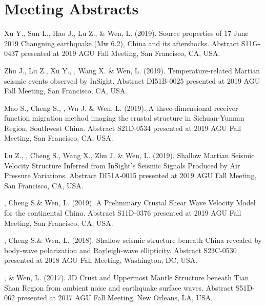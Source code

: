 \section*{Meeting Abstracts}
\begin{etaremune}
\item
    Xu Y., Sun L., Hao J., Lu Z., \Xiao \& Wen, L. (2019).
    Source properties of 17 June 2019 Changning earthquake (Mw 6.2), China and its aftershocks.
    Abstract S11G-0437 presented at 2019 AGU Fall Meeting, San Francisco, CA, USA.
\item
    Zhu J., Lu Z., Xu Y., \Xiao, Wang X. \& Wen, L. (2019).
    Temperature-related Martian seismic events observed by InSight.
    Abstract DI51B-0025 presented at 2019 AGU Fall Meeting, San Francisco, CA, USA.
\item
    Mao S., Cheng S., \Xiao, Wu J. \& Wen, L. (2019).
    A three-dimensional receiver function migration method imaging the crustal structure in Sichuan-Yunnan Region, Southwest China. 
    Abstract S21D-0534 presented at 2019 AGU Fall Meeting, San Francisco, CA, USA.
\item
    Lu Z., \Xiao, Cheng S., Wang X., Zhu J. \& Wen, L. (2019).
    Shallow Martian Seismic Velocity Structure Inferred from InSight's Seismic Signals Produced by Air Pressure Variations. 
    Abstract DI51A-0015 presented at 2019 AGU Fall Meeting, San Francisco, CA, USA.
\item
    \Xiao, Cheng S.\& Wen, L. (2019).
    A Preliminary Crustal Shear Wave Velocity Model for the continental China. 
    Abstract S11D-0376 presented at 2019 AGU Fall Meeting, San Francisco, CA, USA.

\item
    \Xiao, Cheng S.\& Wen, L. (2018).
    Shallow seismic structure beneath China revealed by body-wave polarization and Rayleigh-wave ellipticity. 
    Abstract S23C-0530 presented at 2018 AGU Fall Meeting, Washington, DC, USA.
\item
    \Xiao, \& Wen, L. (2017).
    3D Crust and Uppermost Mantle Structure beneath Tian Shan Region from ambient noise and earthquake surface waves. 
    Abstract S51D-062 presented at 2017 AGU Fall Meeting, New Orleans, LA, USA.
\end{etaremune}
